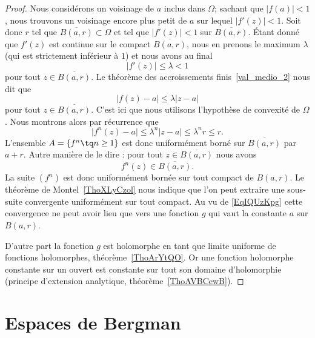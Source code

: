 \begin{proof}
	Nous considérons un voisinage de \( a\) inclus dans \( \Omega\); sachant que \( | f(a) |<1\), nous trouvons un voisinage encore plus petit de \( a\) sur lequel \( | f'(z) |<1\).  Soit donc \( r\) tel que \( \overline{ B(a,r) }\subset \Omega\) et tel que \( | f'(z) |<1\) sur \( \overline{ B(a,r) }\). Étant donné que \( f'(z)\) est continue sur le compact \( \overline{ B(a,r) }\), nous en prenons le maximum \( \lambda\) (qui est strictement inférieur à \( 1\)) et nous avons au final
	\begin{equation}
		| f'(z) |\leq \lambda< 1
	\end{equation}
	pour tout \( z\in \overline{ B(a,r) }\). Le théorème des accroissements finis~\ref{val_medio_2} nous dit que
	\begin{equation}
		\big| f(z)-a \big|\leq \lambda| z-a |
	\end{equation}
	pour tout \( z\in\overline{ B(a,r) }\). C'est ici que nous utilisons l'hypothèse de convexité de \( \Omega\). Nous montrons alors par récurrence que
	\begin{equation}    \label{EqIQUzKpg}
		\big| f^n(z)-a \big|\leq \lambda^n| z-a |\leq \lambda^nr\leq r.
	\end{equation}
	L'ensemble \( A=\{ f^n\tq n\geq 1 \}\) est donc uniformément borné sur \( \overline{ B(a,r) }\) par \( a+r\). Autre manière de le dire : pour tout \( z\in\overline{ B(a,r) }\) nous avons
	\begin{equation}
		f^n(z)\in\overline{ B(a,r) }.
	\end{equation}
	La suite \( (f^n)\) est donc uniformément bornée sur tout compact de \( B(a,r)\). Le théorème de Montel~\ref{ThoXLyCzol} nous indique que l'on peut extraire une sous-suite convergente uniformément sur tout compact. Au vu de \eqref{EqIQUzKpg} cette convergence ne peut avoir lieu que vers une fonction \( g\) qui vaut la constante \( a\) sur \( B(a,r)\).

	D'autre part la fonction \( g\) est holomorphe en tant que limite uniforme de fonctions holomorphes, théorème~\ref{ThoArYtQO}. Or une fonction holomorphe constante sur un ouvert est constante sur tout son domaine d'holomorphie (principe d'extension analytique, théorème~\ref{ThoAVBCewB}).
\end{proof}


\section{Espaces de Bergman}

